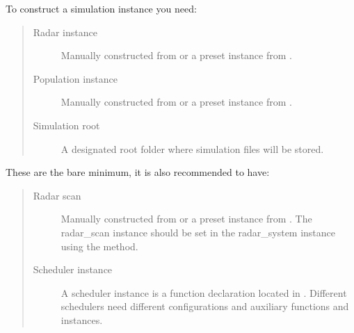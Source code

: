 \documentclass[letterpaper,10pt,english]{sphinxmanual}
\begin{document}
To construct a simulation instance you need:
\begin{quote}\begin{description}
\item[{Radar instance}] \leavevmode
Manually constructed from  or a preset instance from {\hyperref[\detokenize{modules/radar_library:module-radar_library}]{}}.

\item[{Population instance}] \leavevmode
Manually constructed from  or a preset instance from {\hyperref[\detokenize{modules/population:module-population}]{}}.

\item[{Simulation root}] \leavevmode
A designated root folder where simulation files will be stored.

\end{description}\end{quote}

These are the bare minimum, it is also recommended to have:
\begin{quote}\begin{description}
\item[{Radar scan}] \leavevmode
Manually constructed from  or a preset instance from {\hyperref[\detokenize{modules/radar_scan_library:module-radar_scan_library}]{}}. 
The radar\_scan instance should be set in the radar\_system instance using the  method.

\item[{Scheduler instance}] \leavevmode
A scheduler instance is a function declaration located in {\hyperref[\detokenize{modules/scheduler_library:module-scheduler_library}]{}}. Different schedulers need 
different configurations and auxiliary functions and instances.

\end{description}\end{quote}
\end{document}

